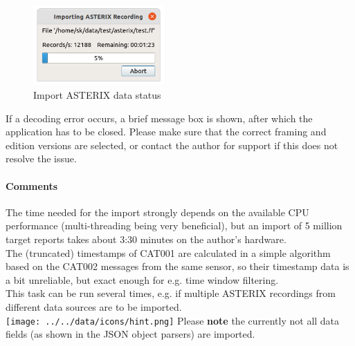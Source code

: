 \begin{figure}[H]
  \center
    \includegraphics[width=5cm]{figures/asterix_import_data_status.png}
  \caption{Import ASTERIX data status}
\end{figure}

If a decoding error occurs, a brief message box is shown, after which the application has to be closed. 
Please make sure that the correct framing and edition versions are selected, or contact the author for support if this does not resolve the issue. \\


\paragraph{Comments}
The time needed for the import strongly depends on the available CPU performance (multi-threading being very beneficial), but an import of 5 million target reports takes about 3:30 minutes on the author's hardware. \\

The (truncated) timestamps of CAT001 are calculated in a simple algorithm based on the CAT002 messages from the same sensor, so their timestamp data is a bit unreliable, but exact enough for e.g. time window filtering. \\

This task can be run several times, e.g. if multiple ASTERIX recordings from different data sources are to be imported. \\

\texttt{[image: ../../data/icons/hint.png]} Please \textbf{note} the currently not all data fields (as shown in the JSON object parsers) are imported.\\


